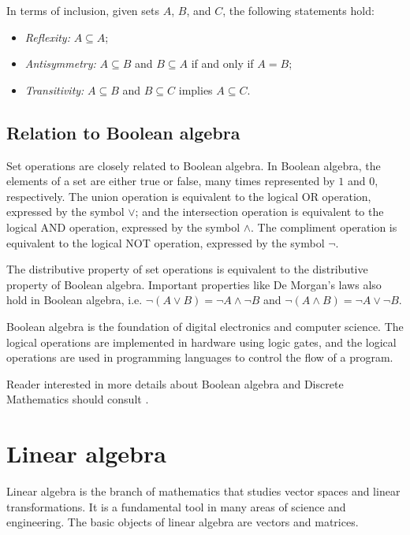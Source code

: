 In terms of inclusion, given sets $A$, $B$, and $C$, the following statements hold:
\begin{itemize}
  \item \emph{Reflexity:} $A \subseteq A$;
  \item \emph{Antisymmetry:} $A \subseteq B$ and $B \subseteq A$ if and only if $A = B$;
  \item \emph{Transitivity:} $A \subseteq B$ and $B \subseteq C$ implies $A \subseteq C$.
\end{itemize}

\subsection{Relation to Boolean algebra}

Set operations are closely related to Boolean algebra.  In Boolean algebra, the elements
of a set are either true or false, many times represented by $1$ and $0$, respectively.
The union operation is equivalent to the logical OR operation, expressed by the symbol
$\lor$; and the intersection operation is equivalent to the logical AND operation,
expressed by the symbol $\land$.  The compliment operation is equivalent to the logical
NOT operation, expressed by the symbol $\lnot$.

The distributive property of set operations is equivalent to the distributive property of
Boolean algebra.  Important properties like De Morgan's laws also hold in Boolean algebra,
i.e. $\lnot (A \lor B) = \lnot A \land \lnot B$ and $\lnot (A \land B) = \lnot A \lor
\lnot B$.

Boolean algebra is the foundation of digital electronics and computer science.  The
logical operations are implemented in hardware using logic gates, and the logical
operations are used in programming languages to control the flow of a program.

Reader interested in more details about Boolean algebra and Discrete Mathematics
should consult \textcite{Rosen2018}.

\section{Linear algebra}

Linear algebra is the branch of mathematics that studies vector spaces and linear
transformations.  It is a fundamental tool in many areas of science and engineering.
The basic objects of linear algebra are vectors and matrices.

